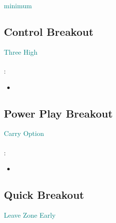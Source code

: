 \documentclass[10pt, french]{article}
\begin{document}
\begin{multicols*}{2}
\begin{minipage}{0.6\columnwidth}
\end{minipage}

\begin{distributions}
\textcolor{teal}{minimum}
\end{distributions}

\subsection*{Control Breakout}

\textcolor{teal}{Three High}

\paragraph{}: 

\begin{minipage}{0.4\columnwidth}
\begin{itemize}[leftmargin = *]
	\item	
\end{itemize}
\end{minipage}
\begin{minipage}{0.6\columnwidth}

\end{minipage}

\subsection*{Power Play Breakout}

\textcolor{teal}{Carry Option}

\paragraph{}: 

\begin{minipage}{0.4\columnwidth}
\begin{itemize}[leftmargin = *]
	\item	
\end{itemize}
\end{minipage}
\begin{minipage}{0.6\columnwidth}

\end{minipage}

\subsection*{Quick Breakout}

\textcolor{teal}{Leave Zone Early}


\end{multicols*}
\end{document}

